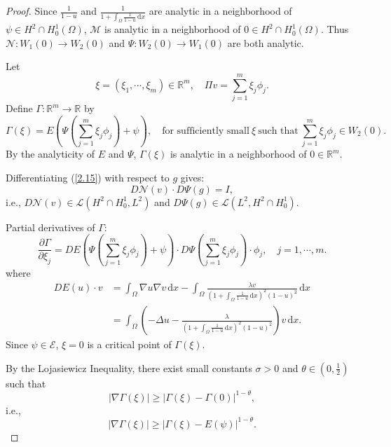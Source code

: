 \documentclass{article}
\numberwithin{equation}{section}
\begin{document}
\begin{proof}
    Since $\frac{1}{1-u}$ and $\frac{1}{1+\int_{\Omega}\frac{1}{1-u}\,\mathrm{d}x}$ are analytic in a neighborhood of $\psi\in H^2\cap H_0^1(\Omega)$, $\mathcal{M}$ is analytic in a neighborhood of $0\in H^2\cap H_0^1(\Omega)$. Thus $\mathcal{N}:W_1(0)\to W_2(0)$ and $\Psi:W_2(0)\to W_1(0)$ are both analytic.

    Let
    $$\xi=(\xi_1,\cdots,\xi_m)\in \mathbb{R}^m,\quad \Pi v=\sum_{j=1}^{m}\xi_j \phi_j.$$
    Define $\Gamma:\mathbb{R}^m\to \mathbb{R}$ by
    $$\Gamma(\xi)=E\left(\Psi\left(\sum_{j=1}^{m}\xi_j \phi_j\right)+\psi\right),\quad \text{for sufficiently small}\ \xi\ \text{such that}\ \sum_{j=1}^{m}\xi_j \phi_j\in W_2(0).$$
    By the analyticity of $E$ and $\Psi$, $\Gamma(\xi)$ is analytic in a neighborhood of $0\in \mathbb{R}^m$.

    Differentiating (\ref{2.15}) with respect to $g$ gives:
    $$D\mathcal{N}(v)\cdot D\Psi(g)=I,$$
    i.e., $D\mathcal{N}(v)\in \mathcal{L}(H^2\cap H_0^1,L^{2})$ and $D\Psi(g)\in \mathcal{L}(L^{2},H^2\cap H_0^1)$.

    Partial derivatives of $\Gamma$:
    \begin{equation}
        \frac{\partial\Gamma}{\partial\xi_j}=DE\left(\Psi\left(\sum_{j=1}^{m}\xi_j \phi_j\right)+\psi\right)\cdot D\Psi \left(\sum_{j=1}^{m}\xi_j \phi_j\right)\cdot \phi_j,\quad j=1,\cdots,m.\label{partial}
    \end{equation}
    where
    \begin{align*}
        DE(u)\cdot v&=\int_{\Omega}\nabla u\nabla v\,\mathrm{d}x-\int_{\Omega}\frac{\lambda v}{(1+\int_{\Omega}\frac{1}{1-u}\,\mathrm{d}x)^2(1-u)^2}\,\mathrm{d}x\\
        &=\int_{\Omega}\left(-\Delta u-\frac{\lambda}{(1+\int_{\Omega}\frac{1}{1-u}\,\mathrm{d}x)^2(1-u)^2}\right)v\,\mathrm{d}x.
    \end{align*}
    Since $\psi\in\mathscr{E}$, $\xi=0$ is a critical point of $\Gamma(\xi)$.

    By the Lojasiewicz Inequality, there exist small constants $\sigma>0$ and $\theta\in (0,\frac{1}{2})$ such that
    $$|\nabla\Gamma(\xi)|\ge |\Gamma(\xi)-\Gamma(0)|^{1-\theta},$$
    i.e.,
    \begin{equation}
        |\nabla\Gamma(\xi)|\ge |\Gamma(\xi)-E(\psi)|^{1-\theta}.\label{2.19}
    \end{equation}


\end{proof}
\end{document}
